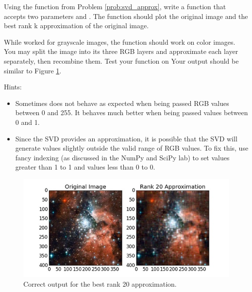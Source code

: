 \begin{problem}
Using the  function from Problem \ref{prob:svd_approx}, write a function  that accepts two parameters  and . The function should plot the original image and the best rank k approximation of the original image.

While  worked for grayscale images, the  function should work on color images.
You may split the image into its three RGB layers and approximate each layer separately, then recombine them.
Test your function on 
Your output should be similar to Figure \ref{fig:compressed_image}.

Hints:
\begin{itemize}
\item Sometimes  does not behave as expected when being passed RGB values between 0 and 255. It behaves much better when being passed values between 0 and 1.
\item Since the SVD provides an approximation, it is possible that the SVD will generate values slightly outside the valid range of RGB values.
To fix this, use fancy indexing (as discussed in the NumPy and SciPy lab) to set values greater than 1 to 1 and values less than 0 to 0.
\end{itemize}

\begin{figure}[H]
\includegraphics[width=\textwidth]{compressed.jpg}
\caption{Correct output for the best rank 20 approximation.}
\label{fig:compressed_image}
\end{figure}
\end{problem}
